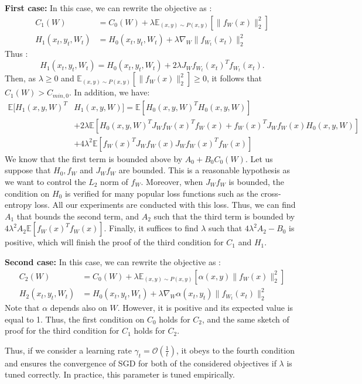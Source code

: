 \documentclass{article}
\begin{document}
\textbf{First case:} In this case, we can rewrite the objective as :
\begin{align}
C_1(W) &= C_0(W) + \lambda \mathbb{E}_{(x,y) \sim P(x,y)}[\| f_W(x)\|_2^2]\nonumber\\ H_1(x_t,y_t,W_t) &= H_0(x_t,y_t,W_t) + \lambda\nabla_W\| f_{W_t}(x_t)\|_2^2
\end{align}
Thus : 
\begin{equation}
H_1(x_t,y_t,W_t) = H_0(x_t,y_t,W_t) + 2\lambda J_Wf_{W_t}(x_t)^Tf_{W_t}(x_t).
\end{equation}
Then, as $\lambda \ge 0$ and $\mathbb{E}_{(x,y) \sim P(x,y)}[\| f_W(x)\|_2^2] \ge 0$, it follows that $C_1(W) > C_{min,0}$. In addition, we have:
\begin{align}
\mathbb{E}[H_1(x,y,W)^T&H_1(x,y,W)] = \mathbb{E}[H_0(x,y,W)^TH_0(x,y,W)] \nonumber\\&+ 2\lambda \mathbb{E}[H_0(x,y,W)^TJ_Wf_{W}(x)^Tf_{W}(x) + f_{W}(x)^TJ_Wf_{W}(x)H_0(x,y,W)] \nonumber\\&+ 4\lambda^2 \mathbb{E}[f_{W}(x)^TJ_Wf_{W}(x)J_Wf_{W}(x)^Tf_{W}(x)]
\end{align}
We know that the first term is bounded above by $A_0 + B_0C_0(W)$. Let us suppose that $H_0, f_W$ and $J_Wf_W$ are bounded. This is a reasonable hypothesis as we want to control the $L_2$ norm of $f_W$. Moreover, when $J_Wf_W$ is bounded, the condition on $H_0$ is verified for many popular loss functions such as the cross-entropy loss. All our experiments are conducted with this loss. Thus, we can find $A_1$ that bounds the second term, and $A_2$ such that the third term is bounded by $4\lambda^2A_2\mathbb{E}[f_{W}(x)^Tf_{W}(x)]$. Finally, it suffices to find $\lambda$ such that $4\lambda^2A_2 - B_0$ is positive, which will finish the proof of the third condition for $C_1$ and $H_1$.

\textbf{Second case:} In this case, we can rewrite the objective as :
\begin{align}
C_2(W) &= C_0(W) + \lambda \mathbb{E}_{(x,y) \sim P(x,y)}[\alpha(x,y)\| f_W(x)\|_2^2]\nonumber\\ H_2(x_t,y_t,W_t) &= H_0(x_t,y_t,W_t) + \lambda\nabla_W\alpha(x_t,y_t)\| f_{W_t}(x_t)\|_2^2
\end{align}
Note that $\alpha$ depends also on $W$. However, it is positive and its expected value is equal to 1. Thus, the first condition on $C_0$ holds for $C_2$, and the same sketch of proof for the third condition for $C_1$ holds for $C_2$.

Thus, if we consider a learning rate $\gamma_t = \mathcal{O}(\frac{1}{t})$, it obeys to the fourth condition and ensures the convergence of SGD for both of the considered objectives if $\lambda$ is tuned correctly. In practice, this parameter is tuned empirically.
\end{document}
